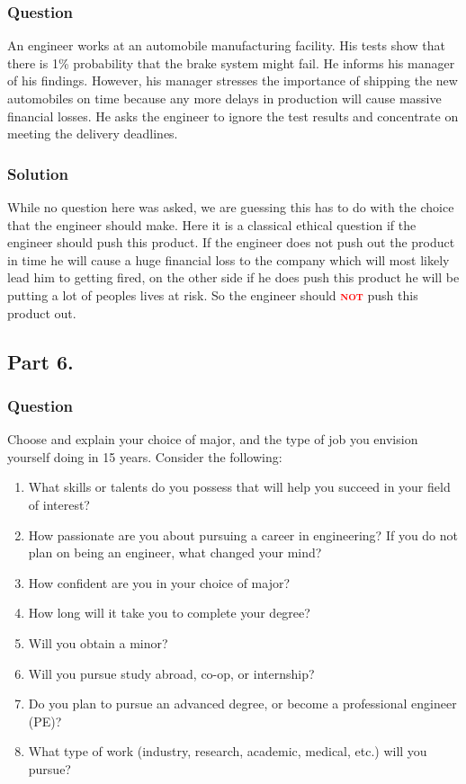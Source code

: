 \documentclass[a4paper, 10pt]{article}
\newcommand{\important}[1]{\textcolor{red}{\textbf{\textsc{#1}}}}
\begin{document}
		\subsubsection{Question}
			\noindent An engineer works at an automobile manufacturing facility. His tests show that there is 1\% probability that the brake system might fail. He informs his manager of his findings. However, his manager stresses the importance of shipping the new automobiles on time because any  more delays in production will cause massive financial losses. He asks the engineer to ignore the test results and concentrate on meeting  the delivery deadlines.
		\subsubsection{Solution}
			\noindent While no question here was asked, we are guessing this has to do with the choice that the engineer should make. Here it is a classical ethical question if the engineer should push this product. If the engineer does not push out the product in time he will cause a huge financial loss to the company which will most likely lead him to getting fired, on the other side if he does push this product he will be putting a lot of peoples lives at risk. So the engineer should \important{not} push this product out.
	\subsection{Part 6.}
		\subsubsection{Question}
			\noindent Choose and explain your choice of major, and the type of job you envision yourself doing in 15 years. Consider the following:
			\begin{enumerate}[label=\alph*)]
				\item What skills or talents do you possess that will help you succeed in your field of interest?
				\item How passionate are you about pursuing a career in engineering? If you do not plan on being an engineer, what changed your mind?
				\item How confident are you in your choice of major?
				\item How long will it take you to complete your degree?
				\item Will you obtain a minor?
				\item Will you pursue study abroad, co-op, or internship?
				\item Do you plan to pursue an advanced degree, or become a professional engineer (PE)?
				\item What type of work (industry, research, academic, medical, etc.) will you pursue?
			\end{enumerate}
\end{document}
